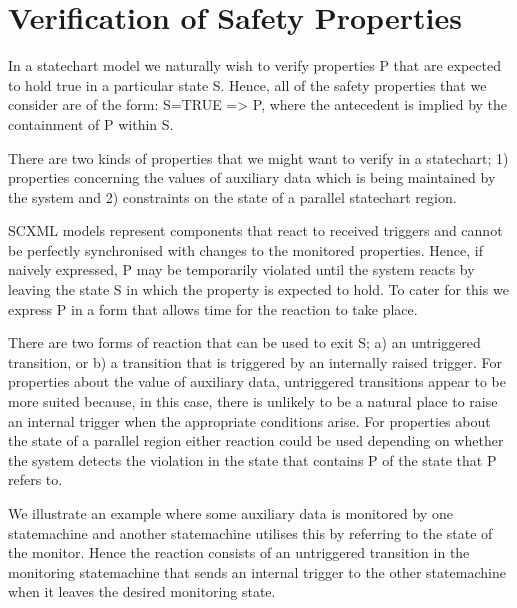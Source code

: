 

\section{Verification of Safety Properties}

In a statechart model we naturally wish to verify properties P that are expected to hold true in a particular state S.
Hence, all of the safety properties that we consider are of the form: S=TRUE => P, where the antecedent is implied by the containment of P within S.

There are two kinds of properties that we might want to verify in a statechart;
1) properties concerning the values of auxiliary data which is being maintained by the system and 2) constraints on the state of a parallel statechart region.

SCXML models represent components that react to received triggers and cannot be perfectly synchronised with changes to the monitored properties. 
Hence, if naively expressed, P may be temporarily violated until the system reacts by leaving the state S in which the property is expected to hold.
To cater for this we express P in a form that allows time for the reaction to take place.

There are two forms of reaction that can be used to exit S; a) an untriggered transition, or b) a transition that is triggered by an internally raised trigger.
For properties about the value of auxiliary data, untriggered transitions appear to be more suited because, in this case, there is unlikely to be a natural place to raise an internal trigger when the appropriate conditions arise.
For properties about the state of a parallel region either reaction could be used depending on whether the system detects the violation in the state that contains P of the state that P refers to.

We illustrate an example where some auxiliary data is monitored by one statemachine  and another statemachine utilises this by referring to the state of the monitor. 
Hence the reaction consists of an untriggered transition in the monitoring statemachine that sends an internal trigger to the other statemachine when it leaves the desired monitoring state.







